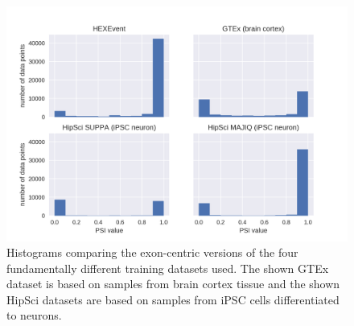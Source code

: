 \begin{figure}
	\centering\includegraphics[width=1\textwidth]{../visualizations/ch4-methods/dataset_histograms_seaborn.png} 
	\caption[test.]{
		Histograms comparing the exon-centric versions of the four fundamentally different training datasets used. The shown GTEx dataset is based on samples from brain cortex tissue and  the shown HipSci datasets are based on samples from iPSC cells differentiated to neurons. 
	}
	\label{fig:datahistograms}
\end{figure}

